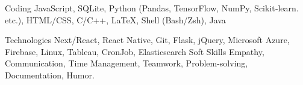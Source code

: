 

\begin{cvskills}

  \cvskill
    {Coding} %
    {JavaScript, SQLite, Python (Pandas, TensorFlow, NumPy, Scikit‑learn. etc.), HTML/CSS, C/C++, LaTeX, Shell (Bash/Zsh), Java} %

  \cvskill
    {Technologies} %
    {Next/React, React Native, Git, Flask, jQuery, Microsoft Azure, Firebase, Linux, Tableau, CronJob, Elasticsearch} %
  \cvskill
    {Soft Skills} %
    {Empathy, Communication, Time Management, Teamwork, Problem-solving, Documentation, Humor.} %
    

\end{cvskills}
